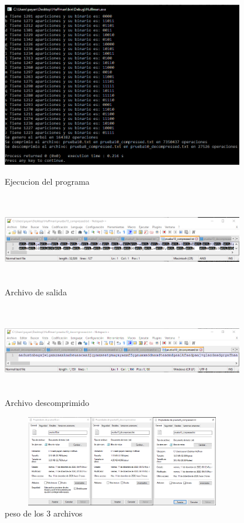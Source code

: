 \documentclass[spanish]{article}
\begin{document}
	\begin{figure}[H]
		\centering
		\includegraphics[width=400px,height=300px]{captura57}
		\caption{Ejecucion del programa}
	\end{figure}
	\begin{figure}[H]
		\centering
		\includegraphics[width=400px,height=150px]{captura58}
		\caption{Archivo de salida}
	\end{figure}
	\begin{figure}[H]
		\centering
		\includegraphics[width=400px,height=150px]{captura59}
		\caption{Archivo descomprimido}
	\end{figure}
	\begin{figure}[H]
		\centering
		\includegraphics[width=400px,height=150px]{captura60}
		\caption{peso de los 3 archivos}
	\end{figure}
\end{document}
